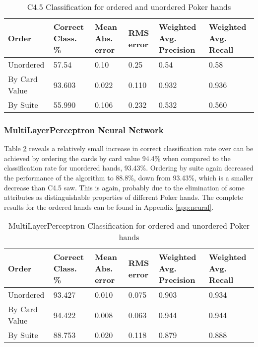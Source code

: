 \documentclass[10pt, a4paper]{article}
\begin{document}
\begin{table}[htbp]
  \centering  
    \begin{tabular}{p{3cm}p{1.5cm}p{1.5cm}p{1.5cm}p{1.5cm}p{1.5cm}}
    \toprule
    \textbf{Order} & Correct Class. \% & Mean Abs. error & RMS error & Weighted Avg. Precision & Weighted Avg. Recall \\
    \midrule
    Unordered & 57.54 & 0.10  & 0.25  & 0.54  & 0.58 \\
    By Card Value & 93.603 & 0.022 & 0.110 & 0.932 & 0.936 \\
    By Suite & 55.990 & 0.106 & 0.232 & 0.532 & 0.560 \\
    \bottomrule
    \end{tabular}%
  \label{tab:addlabel}%
  \caption{C4.5 Classification for ordered and unordered Poker hands}
  \label{tab:dtoresults}%
\end{table}%

\subsubsection*{MultiLayerPerceptron Neural Network}

Table \ref{tab:nnoresults} reveals a relatively small increase in correct classification rate over can be achieved by ordering the cards by card value 94.4\% when compared to the classification rate for unordered hands, 93.43\%. Ordering by suite again decreased the performance of the algorithm to 88.8\%, down from 93.43\%, which is a smaller decrease than C4.5 saw. This is again, probably due to the elimination of some attributes as distinguishable properties of different Poker hands. The complete results for the ordered hands can be found in Appendix \ref{app:neural}.

\begin{table}[htbp]
  \centering  
    \begin{tabular}{p{3cm}p{1.5cm}p{1.5cm}p{1.5cm}p{1.5cm}p{1.5cm}}
    \toprule
    \textbf{Order} & Correct Class. \% & Mean Abs. error & RMS error & Weighted Avg. Precision & Weighted Avg. Recall \\
    \midrule
    Unordered & 93.427 & 0.010 & 0.075 & 0.903 & 0.934 \\
    By Card Value & 94.422 & 0.008 & 0.063 & 0.944 & 0.944 \\
    By Suite & 88.753 & 0.020 & 0.118 & 0.879 & 0.888 \\
    \bottomrule
    \end{tabular}%

  \caption{MultiLayerPerceptron Classification for ordered and unordered Poker hands}
  \label{tab:nnoresults}%
\end{table}%
\end{document}
